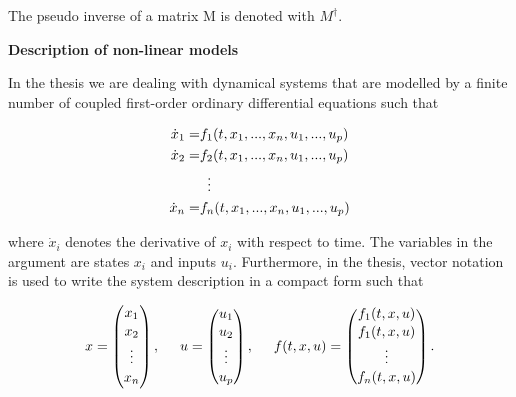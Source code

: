 The pseudo inverse of a matrix M is denoted with $M^{\dagger}$.

\textbf{Description of non-linear models}

In the thesis we are dealing with dynamical systems that are modelled by a finite number of coupled first-order ordinary differential equations such that 

\vspace{-4mm}
\begin{equation*}
\begin{split}
  \label{non-inlet_p1}
  \dot{x}_1 = & f_1(t,x_1, ..., x_n,u_1,...,u_p) \\
  \dot{x}_2 = & f_2(t,x_1, ..., x_n,u_1,...,u_p) \\
   &\mathrel{\makebox[\widthof{=}]{\vdots}} \\
   \dot{x}_n = & f_n(t,x_1, ..., x_n,u_1,...,u_p)
\end{split}
\end{equation*}

where $\dot{x}_i$ denotes the derivative of $x_i$ with respect to time. The variables in the argument are states $x_i$ and inputs $u_i$. Furthermore, in the thesis, vector notation is used to write the system description in a compact form such that 

\vspace{-4mm}
\begin{equation*}
\label{example1_signals_constants}
x =
 \begin{pmatrix} 
 x_1 \\[1.3pt] 
 x_2 \\[1.3pt]
 \vdots \\[1.3pt] 
 x_n \\[1.3pt] 
 \end{pmatrix}
 , \hspace{5mm}
u =  \begin{pmatrix} 
 u_1 \\[1pt] 
 u_2 \\[1pt]
 \vdots \\[1pt] 
 u_p \\[1pt] 
 \end{pmatrix}
 , \hspace{5mm}
 f(t,x,u) =  \begin{pmatrix} 
 f_1(t,x,u) \\[1pt] 
 f_1(t,x,u) \\[1pt]
 \vdots \\[1pt] 
 f_n(t,x,u) \\[1pt] 
 \end{pmatrix}.
\end{equation*}

